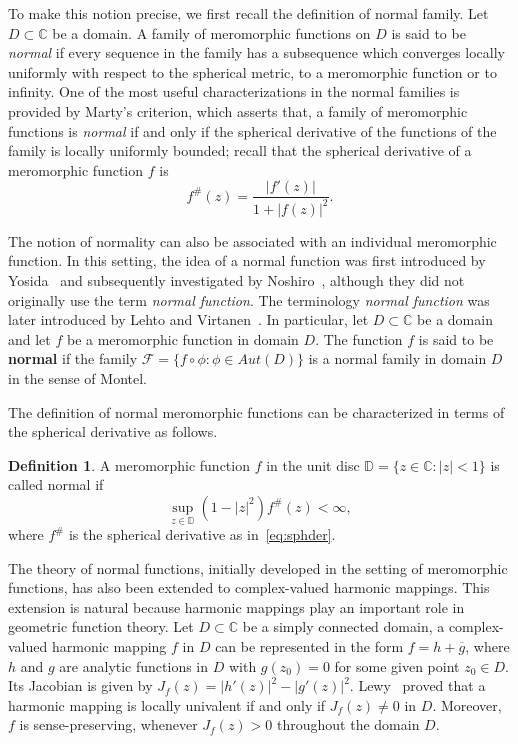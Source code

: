 \documentclass[11pt, reqno]{amsart}
\numberwithin{equation}{section}
\theoremstyle{definition}
\newtheorem{definition}{Definition}[section]
\theoremstyle{remark}
\theoremstyle{plain}
\begin{document}
To make this notion precise, we first recall the definition of 
normal family.
Let $D\subset \mathbb{C}$ be a domain. A family of meromorphic 
functions on $D$  is said to be
\textit{normal} if every sequence in the family has a 
subsequence which converges locally uniformly with 
respect to the spherical metric, to a meromorphic
function or to infinity.
One of the most useful characterizations in the normal
families is provided by Marty's criterion, which asserts that,
a family of meromorphic functions is {\it normal} if and only if the
spherical derivative of the functions of the family is
locally uniformly bounded; recall that the spherical derivative
 of a meromorphic function $f$
is 
\begin{equation}\label{eq:sphder}
f^\#(z)=\frac{|f'(z)|}{1+|f(z)|^2}.
\end{equation}  
\smallskip 

The notion of normality can also be associated with an individual
meromorphic function. In this setting,
the idea of a normal function was first introduced 
by Yosida~\cite{Yosida1934} and
subsequently investigated by Noshiro~\cite{Noshiro1938}, although
they did not originally use the term {\it normal function}.
The terminology {\it normal function} was later introduced 
by Lehto and Virtanen~\cite{LehtoVirtanen1957}. In particular, let $D\subset\mathbb{C}$
 be a domain and let $f$ be a meromorphic function in
 domain $D$. The function $f$ is said to be
 {\bf normal} if the family $\mathcal{F}=\{f\circ\phi: \phi \in Aut{(D)}\}$
 is a normal family in domain $D$ in the sense of Montel.
 \smallskip
 
 The definition of normal meromorphic functions can be 
 characterized in terms of the spherical derivative as follows.

\begin{definition}\cite{LehtoVirtanen1957}
  A meromorphic function $f$ in the unit disc 
  $\mathbb{D}=\{z\in \mathbb{C}:|z|<1\}$ is
  called normal if
  \[
  \sup_{z\in\mathbb{D}}(1-|z|^2)f^\#(z)<\infty,
  \] 
  where $f^\#$ is the spherical derivative as in~\eqref{eq:sphder}.
\end{definition}

The theory of normal functions, initially developed
in the setting of meromorphic functions, has also been 
extended to complex-valued harmonic mappings. This extension is natural
because harmonic mappings play an important role in
geometric function theory.
Let $D\subset \mathbb{C}$ be a simply connected domain, 
a complex-valued harmonic mapping $f$
in $D$ can be represented in the form 
$f=h+\overline{g}$, where $h$ and $g$
are analytic functions in $D$ with $g(z_0)=0$ for some given
point $z_0\in D$. Its Jacobian is given by 
$J_f(z)=|h'(z)|^2-|g'(z)|^2$. Lewy~\cite{Lewy1936}
proved that
a harmonic mapping is locally univalent if and only 
if $J_f(z)\neq0$ in $D$. Moreover,
$f$ is sense-preserving, whenever $J_f(z)>0$ 
throughout the domain $D$.
\smallskip
\end{document}
